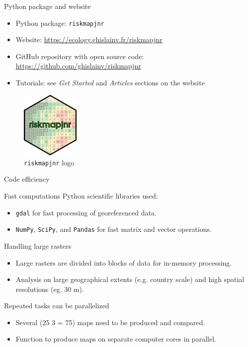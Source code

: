 \documentclass[10pt,table,dvipsnames,compress]{beamer}
\begin{document}
\begin{frame}[label={sec:org439cea8},fragile]{Python package and website}
 \begin{itemize}
\item Python package: \texttt{riskmapjnr}
\item Website: \url{https://ecology.ghislainv.fr/riskmapjnr}
\item GitHub repository with open source code: \url{https://github.com/ghislainv/riskmapjnr}
\item Tutorials: see \emph{Get Started} and \emph{Articles} sections on the website
\end{itemize}

\begin{figure}[htbp]
\centering
\includegraphics[width=0.25\textwidth]{figs/logo-riskmapjnr.png}
\caption{\texttt{riskmapjnr} logo}
\end{figure}
\end{frame}

\begin{frame}[label={sec:orgac4f7f1},fragile]{Code efficiency}
 \begin{block}{Fast computations}
Python scientific libraries used:
\begin{itemize}
\item \texttt{gdal} for fast processing of georeferenced data.
\item \texttt{NumPy}, \texttt{SciPy}, and \texttt{Pandas} for fast matrix and vector operations.
\end{itemize}
\end{block}

\begin{block}{Handling large rasters}
\begin{itemize}
\item Large rasters are divided into blocks of data for in-memory processing.
\item Analysis on large geographical extents (e.g. country scale) and high spatial resolutions (eg. 30 m).
\end{itemize}
\end{block}

\begin{block}{Repeated tasks can be parallelized}
\begin{itemize}
\item Several (25 \texttimes{} 3 = 75) maps need to be produced and compared.
\item Function to produce maps on separate computer cores in parallel.
\end{itemize}
\end{block}
\end{frame}
\end{document}
